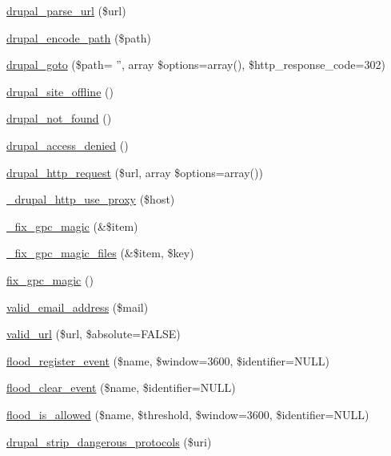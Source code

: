 \begin{DoxyCompactItemize}
\item 
\hyperlink{group__php__wrappers_ga77e7930986edc614b20850a0a281609d}{drupal\_\-parse\_\-url} (\$url)
\item 
\hyperlink{group__http__handling_gab333a51385bd4e339c464943553a6670}{drupal\_\-encode\_\-path} (\$path)
\item 
\hyperlink{group__http__handling_ga5b68d7a934713d1d623b2b32a732235d}{drupal\_\-goto} (\$path= '', array \$options=array(), \$http\_\-response\_\-code=302)
\item 
\hyperlink{group__http__handling_gafc3a1915f45be2ac8666778eef0e9758}{drupal\_\-site\_\-offline} ()
\item 
\hyperlink{group__http__handling_ga52b08cd98e1756326c1bd5b56c39a884}{drupal\_\-not\_\-found} ()
\item 
\hyperlink{group__http__handling_ga0bbff371f9373002e71f2e1347fcf481}{drupal\_\-access\_\-denied} ()
\item 
\hyperlink{group__http__handling_gaad3affacd718b960300dcdddefa518aa}{drupal\_\-http\_\-request} (\$url, array \$options=array())
\item 
\hyperlink{group__http__handling_gadfd5b8902a9838e814df472cdd930106}{\_\-drupal\_\-http\_\-use\_\-proxy} (\$host)
\item 
\hyperlink{common_8inc_a4060ad61de80e6b8931ce8ad3c3aaebc}{\_\-fix\_\-gpc\_\-magic} (\&\$item)
\item 
\hyperlink{common_8inc_aca820a7438df9d2244148e4b8895291e}{\_\-fix\_\-gpc\_\-magic\_\-files} (\&\$item, \$key)
\item 
\hyperlink{common_8inc_abefb935bf3c61840ba9ad50adb13f766}{fix\_\-gpc\_\-magic} ()
\item 
\hyperlink{group__validation_ga486c51f034746a76618602e1e76fa718}{valid\_\-email\_\-address} (\$mail)
\item 
\hyperlink{group__validation_gae9221d1759a8d5a2ba2db93ae3a6feff}{valid\_\-url} (\$url, \$absolute=FALSE)
\item 
\hyperlink{common_8inc_adb073363e7ad9091fc5f378988e4d019}{flood\_\-register\_\-event} (\$name, \$window=3600, \$identifier=NULL)
\item 
\hyperlink{common_8inc_acf1b82b44af425575c6b1137e9b1e65a}{flood\_\-clear\_\-event} (\$name, \$identifier=NULL)
\item 
\hyperlink{common_8inc_a4c6d4ab47d558e42ac08f5fbf90f2d6f}{flood\_\-is\_\-allowed} (\$name, \$threshold, \$window=3600, \$identifier=NULL)
\item 
\hyperlink{group__sanitization_ga46ff2822d576a77317f9045d65317b4f}{drupal\_\-strip\_\-dangerous\_\-protocols} (\$uri)

\end{DoxyCompactItemize}

